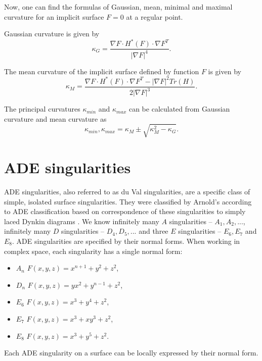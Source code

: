 Now, one can find the formulas of Gaussian, mean, minimal and maximal curvature
for an implicit surface $F=0$ at a regular point.

Gaussian curvature is given by 
$$\kappa_G = \frac{\nabla F \cdot H^*(F) \cdot \nabla F^T}{|\nabla F|^4}.$$

The mean curvature of the implicit surface defined by function $F$ is given by 
$$\kappa_M = \frac{\nabla F \cdot H^*(F) \cdot \nabla F^T - | \nabla F |^2 Tr(H)}{2|\nabla F|^3}.$$

The principal curvatures $\kappa_{min}$ and $\kappa_{max}$ can be calculated from Gaussian curvature and
mean curvature as 
$$\kappa_{min}, \kappa_{max} = \kappa_M \pm \sqrt{\kappa_M^2-\kappa_G}.$$

\section{ADE singularities}
\label{sub2.2}

ADE singularities, also referred to as du Val singularities, are a specific
class of simple, isolated surface singularities.
They were classified by Arnold's
\cite{arnol1972normal} according to ADE classification
\cite{hazewinkel1977ubiquity} based on
correspondence of these singularities to simply laced Dynkin diagrams
\cite{dynkin1947structure}.
We know infinitely many $A$ singularities -- $A_1, A_2, ...$,
infinitely many $D$ singularities -- $D_4, D_5, ...$ and three $E$
singularities -- $E_6, E_7$ and $E_8$.
ADE singularities are specified by their normal forms.
When working in complex space, each singularity has a single normal form:
\begin{itemize}
    \item $A_n$ \hspace{5mm} $F(x,y,z)=x^{n+1}+y^2+z^2$,
    \item $D_n$ \hspace{5mm} $F(x,y,z)=yx^2+y^{n-1}+z^2$,
    \item $E_6$ \hspace{5mm} $F(x,y,z)=x^3+y^4+z^2$,
    \item $E_7$ \hspace{5mm} $F(x,y,z)=x^3+xy^3+z^2$,
    \item $E_8$ \hspace{5mm} $F(x,y,z)=x^3+y^5+z^2$.
\end{itemize}

Each ADE singularity on a surface can be locally expressed by their
normal form.

